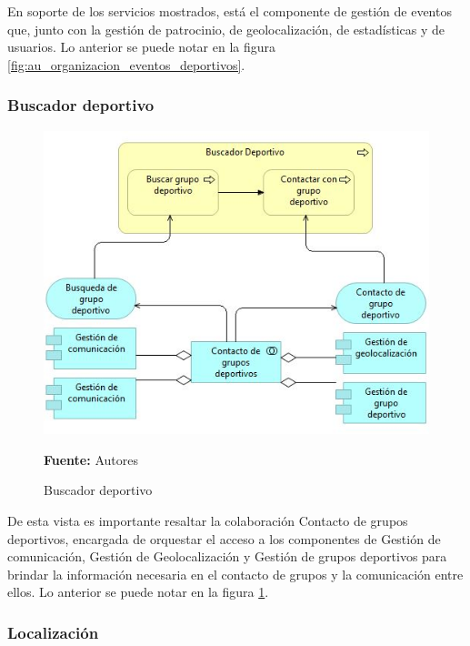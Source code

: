 En soporte de los servicios mostrados, está el componente de gestión de eventos que, junto con la gestión de patrocinio, de geolocalización, de estadísticas y de usuarios. Lo anterior se puede notar en la figura \ref{fig:au_organizacion_eventos_deportivos}.

\subsubsection{Buscador deportivo}

\begin{figure}[!htb]
  \begin{center}
    \includegraphics[width=12cm]{./imagenes/Archimate/vistas/application_usage/buscadordeportivo.png}
    \caption{Buscador deportivo}
    \label{fig:BP_BuscadorDeportivo}
    \textbf{Fuente:}  Autores \\
  \end{center}
\end{figure}

De esta vista es importante resaltar la colaboración Contacto de grupos deportivos, encargada de orquestar el acceso a los componentes de Gestión de comunicación, Gestión de Geolocalización y Gestión de grupos deportivos para brindar la información necesaria en el contacto de grupos y la comunicación entre ellos. Lo anterior se puede notar en la figura \ref{fig:BP_BuscadorDeportivo}.

\subsubsection{Localización}


